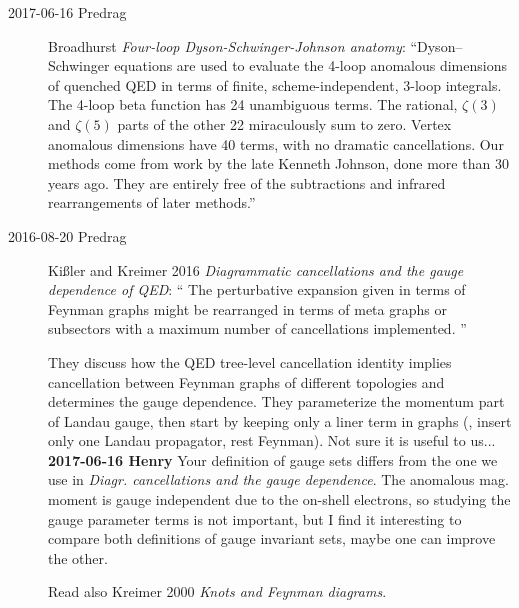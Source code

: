 \begin{description}
\item[2017-06-16 Predrag]
Broadhurst {\em Four-loop Dyson-Schwinger-Johnson
anatomy}: ``Dyson–Schwinger equations are used to evaluate the 4-loop
anomalous dimensions of quenched QED in terms of finite,
scheme-independent, 3-loop integrals. The 4-loop beta function has 24
unambiguous terms. The rational, $\zeta(3)$ and $\zeta(5)$ parts of the
other 22 miraculously sum to zero. Vertex anomalous dimensions have 40
terms, with no dramatic cancellations. Our methods come from work by the
late Kenneth Johnson, done more than 30 years ago. They are entirely free
of the subtractions and infrared rearrangements of later methods.''

\item[2016-08-20 Predrag]
Ki{\ss}ler and Kreimer 2016
{\em Diagrammatic cancellations and the gauge dependence of {QED}}:
``
The perturbative expansion given in terms of Feynman graphs might be
rearranged in terms of meta graphs or subsectors with a maximum number of
cancellations implemented.
''

They discuss how the QED tree-level cancellation identity implies
cancellation between Feynman graphs of different topologies and
determines the gauge dependence. They parameterize the momentum part of
Landau gauge, then start by keeping only a liner term in graphs (\ie,
insert only one Landau propagator, rest Feynman). Not sure it is useful
to us...
\\{\bf 2017-06-16 Henry}
Your definition of gauge sets
differs from the one we use in {\em Diagr. cancellations and
the gauge dependence}. The anomalous mag. moment is gauge
independent due to the on-shell electrons, so studying the gauge
parameter terms is not important, but I find it interesting to compare
both definitions of gauge invariant sets, maybe one can improve the other.

Read also Kreimer 2000
{\em Knots and {Feynman} diagrams}.


\end{description}
